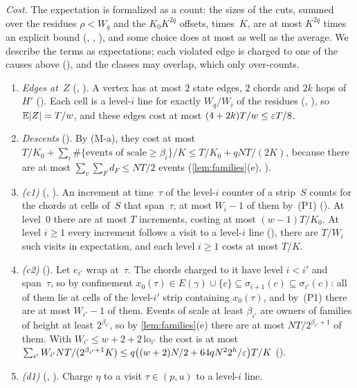 \begin{outline}
\emph{Cost.} The expectation is formalized as a count: the sizes of the cuts, summed over the residues $\rho<W_q$ and the
$K_0K^{2q}$ offsets, times~$K$, are at most $K^{2q}$ times an explicit bound (, ,
), and some choice does at most as well as the average. We describe the terms as expectations; each violated
edge is charged to one of the causes above (), and the classes may overlap, which only over-counts.
\begin{enumerate}[label=(\alph*),leftmargin=2em]
\item \emph{Edges at~$Z$} (, ). A vertex has at most $2$ state edges, $2$ chords and $2k$
hops of~$H'$ (). Each cell is a level-$i$ line for exactly $W_q/W_i$ of the residues
(, ), so $\mathbb E\lvert Z \rvert=T/w$, and these edges cost at most
$(4+2k)T/w\le\varepsilon T/8$.
\item \emph{Descents} (). By (M-a), they cost at most
$T/K_0+\sum_i\#\{\text{events of scale}\ge\beta_i\}/K\le T/K_0+qNT/(2K)$, because there are at most $\sum_v\sum_Fd_F\le
NT/2$ events (\cref{lem:families}(e), ).
\item \emph{(c1)} (, ). An increment at time~$\tau$ of the level-$i$ counter of a
strip~$S$ counts for the chords at cells of~$S$ that span~$\tau$, at most $W_i-1$ of them by~(P1)
(). At level~$0$ there are at most $T$ increments, costing at most $(w-1)T/K_0$. At level
$i\ge1$ every increment follows a visit to a level-$i$ line (), there are $T/W_i$ such visits in
expectation, and each level $i\ge1$ costs at most $T/K$.
\item \emph{(c2)} (). Let $e_{i'}$ wrap at~$\tau$. The chords charged to it have level $i<i'$ and
span~$\tau$, so by confinement $x_0(\tau)\in E(\gamma)\cup\{c\}\subseteq\sigma_{i+1}(c)\subseteq\sigma_{i'}(c)$: all of
them lie at cells of the level-$i'$ strip containing $x_0(\tau)$, and by~(P1) there are at most $W_{i'}-1$ of them.
Events of scale at least $\beta_{i'}$ are owners of families of height at least $2^{\beta_{i'}}$, so by
\cref{lem:families}(e) there are at most $NT/2^{\beta_{i'}+1}$ of them. With $W_{i'}\le w+2+2\,\mathrm{lo}_{i'}$ the cost
is at most $\sum_{i'}W_{i'}NT/(2^{\beta_{i'}+1}K)\le q\bigl((w+2)N/2+64qN^22^h/\varepsilon\bigr)T/K$ ().
\item \emph{(d1)} (, ). Charge $\eta$ to a visit $\tau\in(p,u)$ to a level-$i$ line.

\end{enumerate}
\end{outline}
